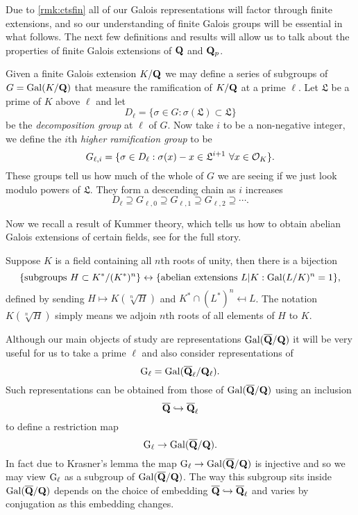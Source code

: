 \documentclass[a4paper,12pt]{article}
\begin{document}
Due to \cref{rmk:ctsfin} all of our Galois representations will factor through finite extensions, and so our understanding of finite Galois groups will be essential in what follows.
The next few definitions and results will allow us to talk about the properties of finite Galois extensions of $\mathbf{Q}$ and $\mathbf{Q}_p$.

\begin{defn}\label{def:higher}
Given a finite Galois extension $K/\mathbf{Q}$ we may define a series of subgroups of $G = \operatorname{Gal}(K/\mathbf{Q})$ that measure the ramification of $K/\mathbf{Q}$ at a prime $\ell$.
Let $\mathfrak{L}$ be a prime of $K$ above $\ell$ and let
\[
D_\ell =\{\sigma \in G : \sigma(\mathfrak{L}) \subset \mathfrak{L}\}
\]
be the \emph{decomposition group} at $\ell$ of $G$.
Now take $i$ to be a non-negative integer, we define the $i$th \emph{higher ramification group} to be
\[
G_{\ell,i} = \{\sigma \in D_\ell : \sigma(x) - x \in \mathfrak{L}^{i + 1}\ \forall x \in \mathcal{O}_{K} \}.
\]
These groups tell us how much of the whole of $G$ we are seeing if we just look modulo powers of $\mathfrak{L}$.
They form a descending chain as $i$ increases
\[
D_\ell\supseteq G_{\ell,0} \supseteq G_{\ell,1} \supseteq G_{\ell, 2}\supseteq\cdots.
\]
\end{defn}

Now we recall a result of Kummer theory, which tells us how to obtain abelian Galois extensions of certain fields, see \cite{Birch} for the full story.

\begin{prop}\label{prop:kummer}
Suppose $K$ is a field containing all $n$th roots of unity, then there is a bijection
\[
\{\text{subgroups }H \subset K^*/(K^*)^n\} \leftrightarrow \{\text{abelian extensions } L| K : \operatorname{Gal}(L/K)^n = 1\},
\]
defined by sending $H\mapsto K(\sqrt[n]{H})$ and $K^* \cap (L^*)^n\mapsfrom L$.
The notation $K(\sqrt[n]{H})$ simply means we adjoin $n$th roots of all elements of $H$ to $K$.
\end{prop}

Although our main objects of study are representations $\operatorname{Gal}(\overline{\mathbf{Q}}/\mathbf{Q})$ it will be very useful for us to take a prime $\ell$ and also consider representations of
\[
\mathrm{G}_\ell = \operatorname{Gal}(\overline{\mathbf{Q}}_\ell/\mathbf{Q}_\ell).
\]
Such representations can be obtained from those of $\operatorname{Gal}(\overline{\mathbf{Q}}/\mathbf{Q})$ using an inclusion
\[
\overline{\mathbf{Q}} \hookrightarrow \overline{\mathbf{Q}}_\ell
\]
to define a restriction map
\[
\mathrm{G}_\ell \to \operatorname{Gal}(\overline{\mathbf{Q}}/\mathbf{Q}).
\]
In fact due to Krasner's lemma \cite[p. 238]{Cohen} the map $\mathrm{G}_\ell \to \operatorname{Gal}(\overline{\mathbf{Q}}/\mathbf{Q})$ is injective and so we may view $\mathrm{G}_\ell$ as a subgroup of $\operatorname{Gal}(\overline{\mathbf{Q}}/\mathbf{Q})$.
The way this subgroup sits inside $\operatorname{Gal}(\overline{\mathbf{Q}}/\mathbf{Q})$ depends on the choice of embedding $\overline{\mathbf{Q}} \hookrightarrow \overline{\mathbf{Q}}_\ell$ and varies by conjugation as this embedding changes.
\end{document}
